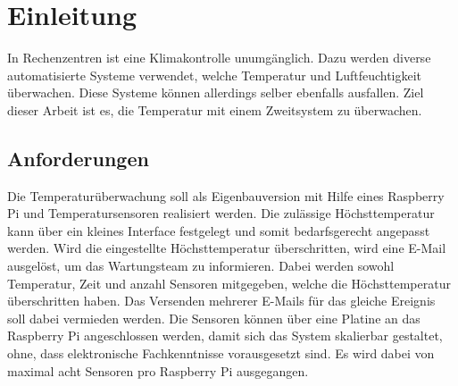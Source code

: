\section{Einleitung}
In Rechenzentren ist eine Klimakontrolle unumgänglich. Dazu werden diverse automatisierte Systeme verwendet, welche Temperatur und Luftfeuchtigkeit überwachen. Diese Systeme können allerdings selber ebenfalls ausfallen. Ziel dieser Arbeit ist es, die Temperatur mit einem Zweitsystem zu überwachen.\\
\subsection{Anforderungen}
Die Temperaturüberwachung soll als Eigenbauversion mit Hilfe eines Raspberry Pi und Temperatursensoren realisiert werden. Die zulässige Höchsttemperatur kann über ein kleines Interface festgelegt und somit bedarfsgerecht angepasst werden. Wird die eingestellte Höchsttemperatur überschritten, wird eine E-Mail ausgelöst, um das Wartungsteam zu informieren. Dabei werden sowohl Temperatur, Zeit und anzahl Sensoren mitgegeben, welche die Höchsttemperatur überschritten haben. Das Versenden mehrerer E-Mails für das gleiche Ereignis soll dabei vermieden werden. Die Sensoren können über eine Platine an das Raspberry Pi angeschlossen werden, damit sich das System skalierbar gestaltet, ohne, dass elektronische Fachkenntnisse vorausgesetzt sind. Es wird dabei von maximal acht Sensoren pro Raspberry Pi ausgegangen.
\newpage